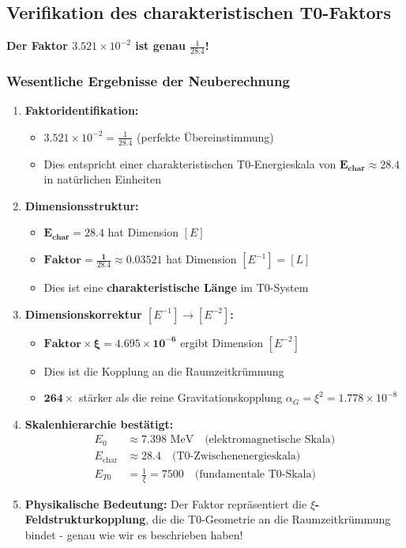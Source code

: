 	\subsection{Verifikation des charakteristischen T0-Faktors}
	
	\textbf{Der Faktor $3.521 \times 10^{-2}$ ist genau $\frac{1}{28.4}$!}
	
	\subsubsection{Wesentliche Ergebnisse der Neuberechnung}
	
	\begin{enumerate}
		\item \textbf{Faktoridentifikation:}
		\begin{itemize}
			\item $3.521 \times 10^{-2} = \frac{1}{28.4}$ (perfekte Übereinstimmung)
			\item Dies entspricht einer charakteristischen T0-Energieskala von $\mathbf{E_{\text{char}} \approx 28.4}$ in natürlichen Einheiten
		\end{itemize}
		
		\item \textbf{Dimensionsstruktur:}
		\begin{itemize}
			\item $\mathbf{E_{\text{char}} = 28.4}$ hat Dimension $[E]$
			\item $\mathbf{\text{Faktor} = \frac{1}{28.4} \approx 0.03521}$ hat Dimension $[E^{-1}] = [L]$
			\item Dies ist eine \textbf{charakteristische Länge} im T0-System
		\end{itemize}
		
		\item \textbf{Dimensionskorrektur $[E^{-1}] \rightarrow [E^{-2}]$:}
		\begin{itemize}
			\item $\mathbf{\text{Faktor} \times \xi = 4.695 \times 10^{-6}}$ ergibt Dimension $[E^{-2}]$
			\item Dies ist die Kopplung an die Raumzeitkrümmung
			\item $\mathbf{264\times}$ stärker als die reine Gravitationskopplung $\alpha_G = \xi^2 = 1.778 \times 10^{-8}$
		\end{itemize}
		
		\item \textbf{Skalenhierarchie bestätigt:}
		\begin{align}
			E_0 &\approx 7.398 \text{ MeV} \quad \text{(elektromagnetische Skala)} \\
			E_{\text{char}} &\approx 28.4 \quad \text{(T0-Zwischenenergieskala)} \\
			E_{T0} &= \frac{1}{\xi} = 7500 \quad \text{(fundamentale T0-Skala)}
		\end{align}
		
		\item \textbf{Physikalische Bedeutung:}
		Der Faktor repräsentiert die \textbf{$\xi$-Feldstrukturkopplung}, die die T0-Geometrie an die Raumzeitkrümmung bindet - genau wie wir es beschrieben haben!
	\end{enumerate}
	
